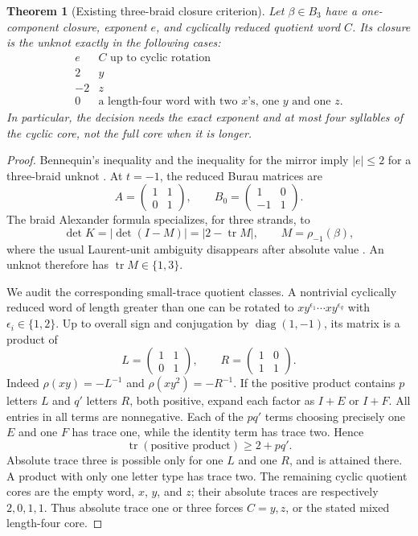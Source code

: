 \documentclass[11pt,letterpaper]{article}
\newtheorem{theorem}{Theorem}[section]
\theoremstyle{definition}\newtheorem{definition}[theorem]{Definition}
\theoremstyle{remark}\newtheorem{remark}[theorem]{Remark}
\newcommand{\tr}{\operatorname{tr}}
\begin{document}
\begin{theorem}[Existing three-braid closure criterion]\label{thm:criterion}
Let $\beta\in B_3$ have a one-component closure, exponent $e$, and cyclically reduced quotient word $C$. Its closure is the unknot exactly in the following cases:
\[
\begin{array}{c|l}
 e& C\text{ up to cyclic rotation}\\\hline
 2&y\\
 -2&z\\
 0&\text{a length-four word with two }x\text{'s, one }y\text{ and one }z.
\end{array}
\]
In particular, the decision needs the exact exponent and at most four syllables of the cyclic core, not the full core when it is longer.
\end{theorem}
\begin{proof}
Bennequin's inequality and the inequality for the mirror imply $|e|\le2$ for a three-braid unknot \cite{bennequin}. At $t=-1$, the reduced Burau matrices are
\[
 A=\begin{pmatrix}1&1\\0&1\end{pmatrix},\qquad
 B_0=\begin{pmatrix}1&0\\-1&1\end{pmatrix}.
\]
The braid Alexander formula specializes, for three strands, to
\[
 \det K=\left|\det(I-M)\right|=|2-\tr M|,
 \qquad M=\rho_{-1}(\beta),
\]
where the usual Laurent-unit ambiguity disappears after absolute value \cite{conway}. An unknot therefore has $\tr M\in\{1,3\}$.

We audit the corresponding small-trace quotient classes. A nontrivial cyclically reduced word of length greater than one can be rotated to
$x y^{\epsilon_1}\cdots x y^{\epsilon_q}$ with $\epsilon_i\in\{1,2\}$. Up to overall sign and conjugation by $\operatorname{diag}(1,-1)$, its matrix is a product of
\[
 L=\begin{pmatrix}1&1\\0&1\end{pmatrix},\qquad
 R=\begin{pmatrix}1&0\\1&1\end{pmatrix}.
\]
Indeed $\rho(xy)=-L^{-1}$ and $\rho(xy^2)=-R^{-1}$. If the positive product contains $p$ letters $L$ and $q'$ letters $R$, both positive, expand each factor as $I+E$ or $I+F$. All entries in all terms are nonnegative. Each of the $p q'$ terms choosing precisely one $E$ and one $F$ has trace one, while the identity term has trace two. Hence
\[
 \tr(\text{positive product})\ge2+p q'.
\]
Absolute trace three is possible only for one $L$ and one $R$, and is attained there. A product with only one letter type has trace two. The remaining cyclic quotient cores are the empty word, $x$, $y$, and $z$; their absolute traces are respectively $2,0,1,1$. Thus absolute trace one or three forces $C=y,z$, or the stated mixed length-four core.


\end{proof}
\end{document}
